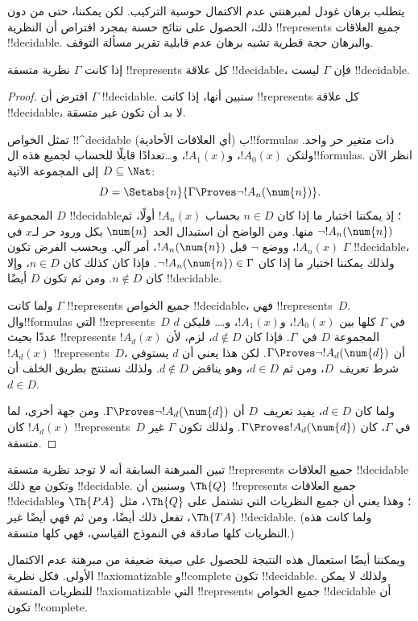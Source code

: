 \documentclass[../../../include/open-logic-section]{subfiles}
\begin{document}


يتطلب برهان غودل لمبرهنتي عدم الاكتمال حوسبة التركيب. لكن يمكننا،
حتى من دون ذلك، الحصول على نتائج حسنة بمجرد افتراض أن النظرية
!!{represents} جميع العلاقات !!{decidable}. والبرهان حجة قطرية تشبه
برهان عدم قابلية تقرير مسألة التوقف.

\begin{thm}
إذا كانت $\Gamma$ نظرية متسقة !!{represents} كل علاقة !!{decidable}،
فإن $\Gamma$ ليست !!{decidable}.
\end{thm}

\begin{proof}
افترض أن $\Gamma$ !!{decidable}. سنبين أنها، إذا كانت !!{represents}
كل علاقة !!{decidable}، لا بد أن تكون غير متسقة.

تمثل الخواص !!^{decidable} (أي العلاقات الأحادية) ب!!{formula}s ذات
متغير حر واحد. ولتكن $!A_0(x)$، و$!A_1(x)$، و\dots تعدادًا قابلًا
للحساب لجميع هذه ال!!{formula}s. انظر الآن إلى المجموعة الآتية
$D\subseteq\Nat$:
\[
D = \Setabs{n}{\Gamma \Proves \lnot !A_n(\num{n})}.
\]
المجموعة $D$ !!{decidable}؛ إذ يمكننا اختبار ما إذا كان $n\in D$
بحساب $!A_n(x)$ أولًا، ثم $\lnot !A_n(\num{n})$ منها. ومن الواضح أن
استبدال الحد $\num{n}$ بكل ورود حر لـ$x$ في $!A_n(x)$، ووضع
$\lnot$ قبل $!A_n(\num{n})$، أمر آلي. وبحسب الفرض تكون $\Gamma$
!!{decidable}، ولذلك يمكننا اختبار ما إذا كان
$\lnot !A_n(\num{n})\in\Gamma$. فإذا كان كذلك كان $n\in D$، وإلا كان
$n\notin D$. ومن ثم تكون $D$ أيضًا !!{decidable}.

ولما كانت $\Gamma$ !!{represents} جميع الخواص !!{decidable}، فهي
!!{represents}~$D$. وال!!{formula}s التي !!{represents}~$D$ في
$\Gamma$ كلها بين $!A_0(x)$، و$!A_1(x)$، و\dots. فليكن $d$ عددًا
بحيث !!{represents} $!A_d(x)$ المجموعة $D$ في~$\Gamma$. فإذا كان
$d\notin D$، لزم، لأن $!A_d(x)$ !!{represents}~$D$، أن
$\Gamma\Proves\lnot !A_d(\num{d})$. لكن هذا يعني أن $d$ يستوفي شرط
تعريف~$D$، ومن ثم $d\in D$، وهو يناقض $d\notin D$. ولذلك نستنتج
بطريق الخلف أن $d\in D$.

ولما كان $d\in D$، يفيد تعريف~$D$ أن
$\Gamma\Proves\lnot !A_d(\num{d})$. ومن جهة أخرى، لما كان
$!A_d(x)$ !!{represents}~$D$ في $\Gamma$، كان
$\Gamma\Proves !A_d(\num{d})$. ولذلك تكون $\Gamma$ غير متسقة.
\end{proof}

\begin{explain}
تبين المبرهنة السابقة أنه لا توجد نظرية متسقة !!{represents} جميع
العلاقات !!{decidable} وتكون مع ذلك !!{decidable}. وسنبين أن $\Th{Q}$
!!{represents} جميع العلاقات !!{decidable}؛ وهذا يعني أن جميع
النظريات التي تشتمل على $\Th{Q}$، مثل $\Th{PA}$ و$\Th{TA}$، تفعل
ذلك أيضًا، ومن ثم فهي أيضًا غير !!{decidable}. (ولما كانت هذه
النظريات كلها صادقة في النموذج القياسي، فهي كلها متسقة.)

ويمكننا أيضًا استعمال هذه النتيجة للحصول على صيغة ضعيفة من مبرهنة
عدم الاكتمال الأولى. فكل نظرية !!{axiomatizable} و!!{complete} تكون
!!{decidable}. ولذلك لا يمكن للنظريات المتسقة !!{axiomatizable} التي
!!{represents} جميع الخواص !!{decidable} أن تكون !!{complete}.
\end{explain}
\end{document}
